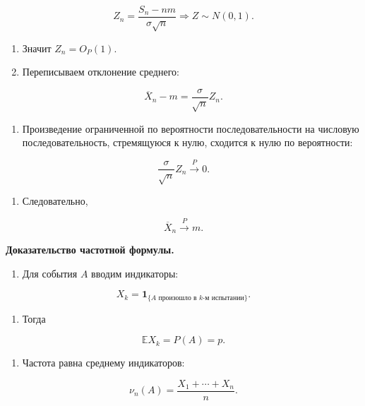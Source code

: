 \documentclass[
  11pt,
  a4paper,
]{article}
\providecommand{\tightlist}{%
  \setlength{\itemsep}{0pt}\setlength{\parskip}{0pt}}
\begin{document}
\[
Z_n=\frac{S_n-nm}{\sigma\sqrt n}
\Rightarrow
Z\sim N(0,1).
\]

\begin{enumerate}
\def\labelenumi{\arabic{enumi}.}
\setcounter{enumi}{1}
\item
  Значит \(Z_n=O_P(1)\).
\item
  Переписываем отклонение среднего:
\end{enumerate}

\[
\overline X_n-m
=
\frac{\sigma}{\sqrt n}Z_n.
\]

\begin{enumerate}
\def\labelenumi{\arabic{enumi}.}
\setcounter{enumi}{3}
\tightlist
\item
  Произведение ограниченной по вероятности последовательности на
  числовую последовательность, стремящуюся к нулю, сходится к нулю по
  вероятности:
\end{enumerate}

\[
\frac{\sigma}{\sqrt n}Z_n\xrightarrow{P}0.
\]

\begin{enumerate}
\def\labelenumi{\arabic{enumi}.}
\setcounter{enumi}{4}
\tightlist
\item
  Следовательно,
\end{enumerate}

\[
\overline X_n\xrightarrow{P}m.
\]

\textbf{Доказательство частотной формулы.}

\begin{enumerate}
\def\labelenumi{\arabic{enumi}.}
\tightlist
\item
  Для события \(A\) вводим индикаторы:
\end{enumerate}

\[
X_k=\mathbf 1_{\{A\text{ произошло в }k\text{-м испытании}\}}.
\]

\begin{enumerate}
\def\labelenumi{\arabic{enumi}.}
\setcounter{enumi}{1}
\tightlist
\item
  Тогда
\end{enumerate}

\[
\mathbb EX_k=P(A)=p.
\]

\begin{enumerate}
\def\labelenumi{\arabic{enumi}.}
\setcounter{enumi}{2}
\tightlist
\item
  Частота равна среднему индикаторов:
\end{enumerate}

\[
\nu_n(A)=\frac{X_1+\cdots+X_n}{n}.
\]
\end{document}

